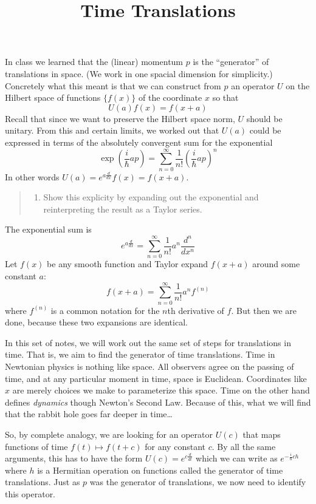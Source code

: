 \documentclass[
  letterpaper,
  DIV=11,
  numbers=noendperiod]{scrartcl}
\title{Time Translations}
\author{}
\date{}
\providecommand{\tightlist}{%
  \setlength{\itemsep}{0pt}\setlength{\parskip}{0pt}}
\begin{document}
\maketitle


In class we learned that the (linear) momentum \(p\) is the
``generator'' of translations in space. (We work in one spacial
dimension for simplicity.) Concretely what this meant is that we can
construct from \(p\) an operator \(U\) on the Hilbert space of functions
\(\{f(x)\}\) of the coordinate \(x\) so that \[
U(a)f(x) = f(x+a)
\] Recall that since we want to preserve the Hilbert space norm, \(U\)
should be unitary. From this and certain limits, we worked out that
\(U(a)\) could be expressed in terms of the absolutely convergent sum
for the exponential \[
\exp \left( \frac i\hbar ap \right) = \sum_{n=0}^\infty \frac1{n!} \left( \frac i\hbar ap \right)^n
\] In other words \(U(a)=e^{a \frac {d}{dx} } f(x) = f(x+a)\).

\begin{quote}
\begin{enumerate}
\def\labelenumi{\arabic{enumi}.}
\setcounter{enumi}{-1}
\tightlist
\item
  Show this explicity by expanding out the exponential and
  reinterpreting the result as a Taylor series.
\end{enumerate}
\end{quote}

The exponential sum is \[
e^{ a\frac d{dx} } = \sum_{n=0}^\infty \frac 1{n!} a^n \frac {d^n}{dx^n}
\] Let \(f(x)\) be any smooth function and Taylor expand \(f(x+a)\)
around some constant \(a\): \[
f(x+a)=\sum_{n=0}^\infty \frac 1{n!} a^n f^{(n)}
\] where \(f^{(n)}\) is a common notation for the \(n\)th derivative of
\(f\). But then we are done, because these two expansions are identical.

In this set of notes, we will work out the same set of steps for
translations in time. That is, we aim to find the generator of time
translations. Time in Newtonian physics is nothing like space. All
observers agree on the passing of time, and at any particular moment in
time, space is Euclidean. Coordinates like \(x\) are merely choices we
make to parameterize this space. Time on the other hand defines
\emph{dynamics} though Newton's Second Law. Because of this, what we
will find that the rabbit hole goes far deeper in time\ldots{}

So, by complete analogy, we are looking for an operator \(U(c)\) that
maps functions of time \(f(t)\mapsto f(t+c)\) for any constant \(c\). By
all the same arguments, this has to have the form
\(U(c)=e^{c \frac d{dt}}\) which we can write as
\(e^{-\frac i\hbar ch }\) where \(h\) is a Hermitian operation on
functions called the generator of time translations. Just as \(p\) was
the generator of translations, we now need to identify this operator.
\end{document}
